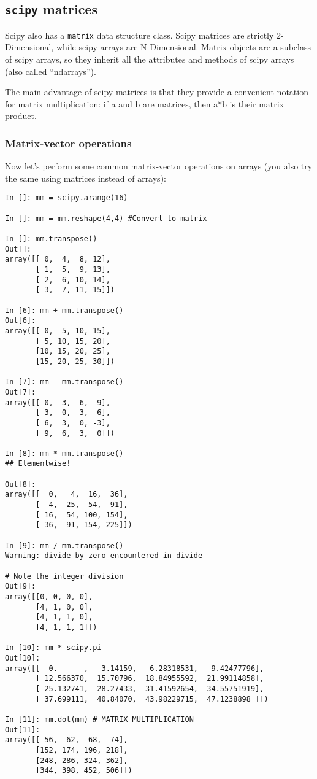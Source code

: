 \subsection{{\tt scipy} matrices}

Scipy also has a {\tt matrix} data structure class. Scipy matrices are 
strictly 2-Dimensional, while scipy arrays are N-Dimensional. Matrix 
objects are a subclass of scipy arrays, so they inherit all the 
attributes and methods of scipy arrays (also called ``ndarrays'').

\begin{tipbox}
The main advantage of scipy matrices is that they provide a convenient 
notation for matrix multiplication: if a and b are matrices, then a*b 
is their matrix product.
\end{tipbox}

\subsubsection{Matrix-vector operations}
Now let's perform some common matrix-vector operations on arrays (you 
also try the same using matrices instead of arrays):
  
\begin{lstlisting}
In []: mm = scipy.arange(16)

In []: mm = mm.reshape(4,4) #Convert to matrix

In []: mm.transpose()
Out[]: 
array([[ 0,  4,  8, 12],
       [ 1,  5,  9, 13],
       [ 2,  6, 10, 14],
       [ 3,  7, 11, 15]])

In [6]: mm + mm.transpose()
Out[6]: 
array([[ 0,  5, 10, 15],
       [ 5, 10, 15, 20],
       [10, 15, 20, 25],
       [15, 20, 25, 30]])

In [7]: mm - mm.transpose()
Out[7]: 
array([[ 0, -3, -6, -9],
       [ 3,  0, -3, -6],
       [ 6,  3,  0, -3],
       [ 9,  6,  3,  0]])

In [8]: mm * mm.transpose()
## Elementwise!

Out[8]: 
array([[  0,   4,  16,  36],
       [  4,  25,  54,  91],
       [ 16,  54, 100, 154],
       [ 36,  91, 154, 225]])

In [9]: mm / mm.transpose()
Warning: divide by zero encountered in divide

# Note the integer division
Out[9]: 
array([[0, 0, 0, 0],
       [4, 1, 0, 0],
       [4, 1, 1, 0],
       [4, 1, 1, 1]])

In [10]: mm * scipy.pi
Out[10]: 
array([[  0.      ,   3.14159,   6.28318531,   9.42477796],
       [ 12.566370,  15.70796,  18.84955592,  21.99114858],
       [ 25.132741,  28.27433,  31.41592654,  34.55751919],
       [ 37.699111,  40.84070,  43.98229715,  47.1238898 ]])

In [11]: mm.dot(mm) # MATRIX MULTIPLICATION
Out[11]: 
array([[ 56,  62,  68,  74],
       [152, 174, 196, 218],
       [248, 286, 324, 362],
       [344, 398, 452, 506]])
\end{lstlisting}

